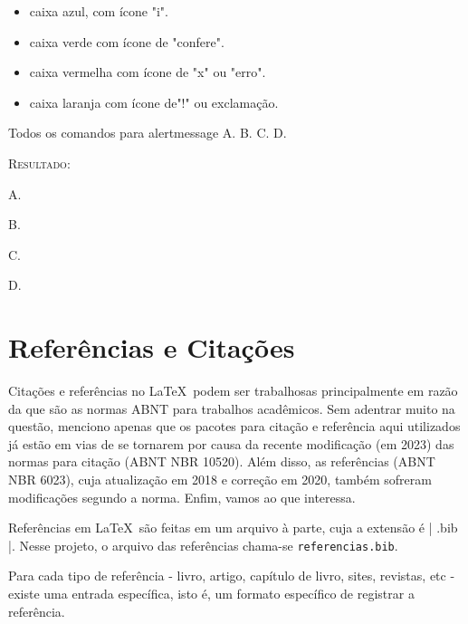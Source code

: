 \documentclass[a4paper,12pt,oneside,openright,extrafontsizes,openbib]{memoir}
\begin{document}
{\begin{itemize}
\item caixa azul, com ícone "i".
\item caixa verde com ícone de "confere".
\item caixa vermelha com ícone de "x" ou "erro".
\item caixa laranja com ícone de"!" ou exclamação.
\end{itemize}


\begin{codex}{Todos os comandos para alertmessage}
	A. 
	B. 
	C. 
	D. 
\end{codex}

\textsc{Resultado:}

A. 

B. 

C. 

D. 


\chapter{Referências e Citações}

Citações e referências no \LaTeX\ podem ser trabalhosas principalmente em razão da  que são as normas ABNT para trabalhos acadêmicos. Sem adentrar muito na questão, menciono apenas que os pacotes para citação e referência aqui utilizados já estão em vias de se tornarem  por causa da recente modificação (em 2023) das normas para citação (ABNT NBR 10520). Além disso, as referências (ABNT NBR 6023), cuja atualização em 2018 e correção em 2020, também sofreram modificações segundo a norma. Enfim, vamos ao que interessa.

Referências em \LaTeX\ são feitas em um arquivo à parte, cuja a extensão é | .bib |. Nesse projeto, o arquivo das referências chama-se \verb|referencias.bib|.

Para cada tipo de referência - livro, artigo, capítulo de livro, sites, revistas, etc - existe uma entrada específica, isto é, um formato específico de registrar a referência.

}
\end{document}
